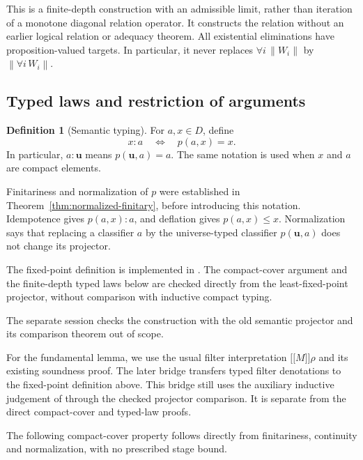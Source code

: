\documentclass[11pt,a4paper]{article}
\theoremstyle{definition}
\newtheorem{definition}[theorem]{Definition}
\theoremstyle{remark}
\newcommand{\ev}[1]{\mathopen{[\![}#1\mathclose{]\!]}}
\newcommand{\trunc}[1]{\left\lVert #1\right\rVert}
\begin{document}
This is a finite-depth construction with an admissible limit, rather than
iteration of a monotone diagonal relation operator. It constructs the
relation without an earlier logical relation or adequacy theorem.
All existential eliminations have proposition-valued targets. In
particular, it never replaces $\forall i\,\trunc{W_i}$ by
$\trunc{\forall i\,W_i}$.

\subsection{Typed laws and restriction of arguments}

\begin{definition}[Semantic typing]\label{def:semantic-typing}
For $a,x\in D$, define
\[
 x:a\quad\Longleftrightarrow\quad p(a,x)=x.
\]
In particular, $a:\mathbf u$ means $p(\mathbf u,a)=a$.
The same notation is used when $x$ and $a$ are compact elements.
\end{definition}

Finitariness and normalization of $p$ were established in
Theorem~\ref{thm:normalized-finitary}, before introducing this notation.
Idempotence gives $p(a,x):a$, and deflation gives $p(a,x)\leq x$.
Normalization says that replacing a classifier $a$ by the universe-typed
classifier $p(\mathbf u,a)$ does not change its projector.

The fixed-point definition is implemented in
. The compact-cover argument and the
finite-depth typed laws below are checked directly from the least-fixed-point
projector, without comparison with inductive compact typing.

The separate session  checks the construction with the old
semantic projector and its comparison theorem out of scope.

For the fundamental lemma, we use the usual filter interpretation
$\ev M\rho$ and its existing soundness proof. The later bridge
 transfers typed filter denotations
to the fixed-point definition above. This bridge still uses the auxiliary
inductive judgement of  through the checked
projector comparison. It is separate from the direct compact-cover and
typed-law proofs.

The following compact-cover property follows directly from finitariness,
continuity and normalization, with no prescribed stage bound.
\end{document}
